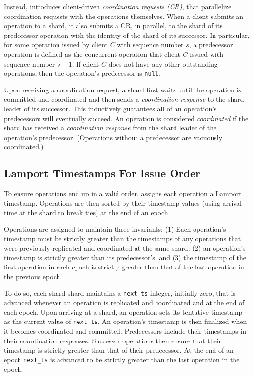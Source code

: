 Instead, \sys{} introduces client-driven \textit{coordination requests (CR)},
that parallelize coordination requests with the operations themselves.  When a
client submits an operation to a shard, it also submits a CR, in parallel, to
the shard of its predecessor operation with the identity of the shard of its
successor.  In particular, for some operation issued by client $C$ with sequence
number $s$, a predecessor operation is defined as the concurrent operation that
client $C$ issued with sequence number $s-1$. If client $C$ does not have any
other outstanding operations, then the operation's predecessor is \texttt{null}.

Upon receiving a coordination request, a shard first waits until the operation
is committed and coordinated and then sends a \textit{coordination response} to
the shard leader of its successor. This inductively guarantees all of an
operation's predecessors will eventually succeed. An operation is considered
\textit{coordinated} if the shard has received a \textit{coordination response}
from the shard leader of the operation's predecessor.  (Operations without a
predecessor are vacuously coordinated.)

\subsection{Lamport Timestamps For Issue Order}\label{sec:design:timestamps}

To ensure operations end up in a valid \MDL{} order, \sys{} assigns each operation a Lamport timestamp.
Operations are then sorted by their timestamp values (using arrival time at the shard to break ties)
at the end of an epoch.

Operations are assigned to maintain three invariants: (1) Each operation's timestamp must
be strictly greater than the timestamps of any operations that were previously replicated and coordinated
at the same shard; (2) an operation's timestamp is strictly greater than its predecessor's; and (3)
the timestamp of the first operation in each epoch is strictly greater than that of the last operation
in the previous epoch. 

To do so, each shard shard maintains a \texttt{next\_ts} integer, initially zero, that is advanced whenever
an operation is replicated and coordinated and at the end of each epoch. Upon arriving at a shard, an operation
sets its tentative timestamp as the current value of \texttt{next\_ts}. An operation's timestamp is then
finalized when it becomes coordinated and committed. Predecessors include their timestamps in their coordination
responses. Successor operations then ensure that their timestamp is strictly greater than that
of their predecessor. At the end of an epoch \texttt{next\_ts} is advanced to be strictly greater than the last
operation in the epoch.

